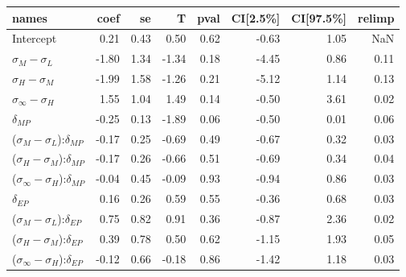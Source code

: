 \begin{tabular}{lrrrrrrr}
\toprule
                                         names &  coef &   se &     T &  pval &  CI[2.5\%] &  CI[97.5\%] &  relimp \\
\midrule
                                     Intercept &  0.21 & 0.43 &  0.50 &  0.62 &      -0.63 &        1.05 &     NaN \\
                     $\sigma_{M} - \sigma_{L}$ & -1.80 & 1.34 & -1.34 &  0.18 &      -4.45 &        0.86 &    0.11 \\
                     $\sigma_{H} - \sigma_{M}$ & -1.99 & 1.58 & -1.26 &  0.21 &      -5.12 &        1.14 &    0.13 \\
                $\sigma_{\infty} - \sigma_{H}$ &  1.55 & 1.04 &  1.49 &  0.14 &      -0.50 &        3.61 &    0.02 \\
                                 $\delta_{MP}$ & -0.25 & 0.13 & -1.89 &  0.06 &      -0.50 &        0.01 &    0.06 \\
     ($\sigma_{M} - \sigma_{L}$):$\delta_{MP}$ & -0.17 & 0.25 & -0.69 &  0.49 &      -0.67 &        0.32 &    0.03 \\
     ($\sigma_{H} - \sigma_{M}$):$\delta_{MP}$ & -0.17 & 0.26 & -0.66 &  0.51 &      -0.69 &        0.34 &    0.04 \\
($\sigma_{\infty} - \sigma_{H}$):$\delta_{MP}$ & -0.04 & 0.45 & -0.09 &  0.93 &      -0.94 &        0.86 &    0.03 \\
                                 $\delta_{EP}$ &  0.16 & 0.26 &  0.59 &  0.55 &      -0.36 &        0.68 &    0.03 \\
     ($\sigma_{M} - \sigma_{L}$):$\delta_{EP}$ &  0.75 & 0.82 &  0.91 &  0.36 &      -0.87 &        2.36 &    0.02 \\
     ($\sigma_{H} - \sigma_{M}$):$\delta_{EP}$ &  0.39 & 0.78 &  0.50 &  0.62 &      -1.15 &        1.93 &    0.05 \\
($\sigma_{\infty} - \sigma_{H}$):$\delta_{EP}$ & -0.12 & 0.66 & -0.18 &  0.86 &      -1.42 &        1.18 &    0.03 \\
\bottomrule
\end{tabular}


